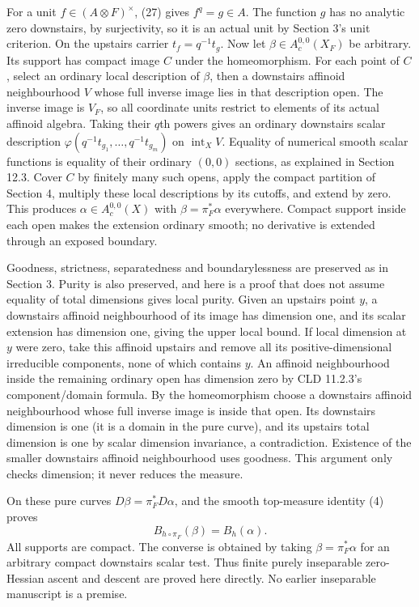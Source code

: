 \documentclass[
  11pt,
]{article}
\begin{document}
For a unit \(f\in(A\otimes F)^\times\), (27) gives \(f^q=g\in A\). The
function \(g\) has no analytic zero downstairs, by surjectivity, so it
is an actual unit by Section 3's unit criterion. On the upstairs carrier
\(t_f=q^{-1}t_g\). Now let \(\beta\in A_c^{0,0}(X_F)\) be arbitrary. Its
support has compact image \(C\) under the homeomorphism. For each point
of \(C\), select an ordinary local description of \(\beta\), then a
downstairs affinoid neighbourhood \(V\) whose full inverse image lies in
that description open. The inverse image is \(V_F\), so all coordinate
units restrict to elements of its actual affinoid algebra. Taking their
\(q\)th powers gives an ordinary downstairs scalar description
\(\varphi(q^{-1}t_{g_1},\ldots,q^{-1}t_{g_m})\) on
\(\operatorname{int}_X V\). Equality of numerical smooth scalar
functions is equality of their ordinary \((0,0)\) sections, as explained
in Section 12.3. Cover \(C\) by finitely many such opens, apply the
compact partition of Section 4, multiply these local descriptions by its
cutoffs, and extend by zero. This produces \(\alpha\in A_c^{0,0}(X)\)
with \(\beta=\pi_F^*\alpha\) everywhere. Compact support inside each
open makes the extension ordinary smooth; no derivative is extended
through an exposed boundary.

Goodness, strictness, separatedness and boundarylessness are preserved
as in Section 3. Purity is also preserved, and here is a proof that does
not assume equality of total dimensions gives local purity. Given an
upstairs point \(y\), a downstairs affinoid neighbourhood of its image
has dimension one, and its scalar extension has dimension one, giving
the upper local bound. If local dimension at \(y\) were zero, take this
affinoid upstairs and remove all its positive-dimensional irreducible
components, none of which contains \(y\). An affinoid neighbourhood
inside the remaining ordinary open has dimension zero by CLD 11.2.3's
component/domain formula. By the homeomorphism choose a downstairs
affinoid neighbourhood whose full inverse image is inside that open. Its
downstairs dimension is one (it is a domain in the pure curve), and its
upstairs total dimension is one by scalar dimension invariance, a
contradiction. Existence of the smaller downstairs affinoid
neighbourhood uses goodness. This argument only checks dimension; it
never reduces the measure.

On these pure curves \(D\beta=\pi_F^*D\alpha\), and the smooth
top-measure identity (4) proves \[
             B_{h\circ\pi_F}(\beta)=B_h(\alpha).         \tag{28}
\] All supports are compact. The converse is obtained by taking
\(\beta=\pi_F^*\alpha\) for an arbitrary compact downstairs scalar test.
Thus finite purely inseparable zero-Hessian ascent and descent are
proved here directly. No earlier inseparable manuscript is a premise.
\end{document}
